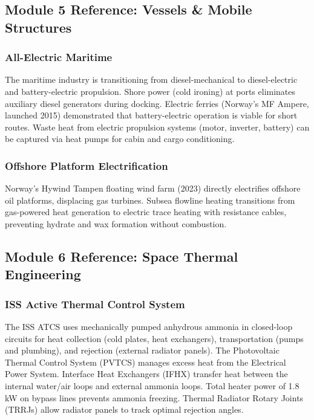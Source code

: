 \documentclass[11pt,letterpaper]{article}
\begin{document}
\subsection{Module 5 Reference: Vessels \& Mobile Structures}

\subsubsection{All-Electric Maritime}
The maritime industry is transitioning from diesel-mechanical to diesel-electric and battery-electric propulsion. Shore power (cold ironing) at ports eliminates auxiliary diesel generators during docking. Electric ferries (Norway's MF Ampere, launched 2015) demonstrated that battery-electric operation is viable for short routes. Waste heat from electric propulsion systems (motor, inverter, battery) can be captured via heat pumps for cabin and cargo conditioning.

\subsubsection{Offshore Platform Electrification}
Norway's Hywind Tampen floating wind farm (2023) directly electrifies offshore oil platforms, displacing gas turbines. Subsea flowline heating transitions from gas-powered heat generation to electric trace heating with resistance cables, preventing hydrate and wax formation without combustion.

\subsection{Module 6 Reference: Space Thermal Engineering}

\subsubsection{ISS Active Thermal Control System}
The ISS ATCS uses mechanically pumped anhydrous ammonia in closed-loop circuits for heat collection (cold plates, heat exchangers), transportation (pumps and plumbing), and rejection (external radiator panels). The Photovoltaic Thermal Control System (PVTCS) manages excess heat from the Electrical Power System. Interface Heat Exchangers (IFHX) transfer heat between the internal water/air loops and external ammonia loops. Total heater power of 1.8 kW on bypass lines prevents ammonia freezing. Thermal Radiator Rotary Joints (TRRJs) allow radiator panels to track optimal rejection angles.
\end{document}
